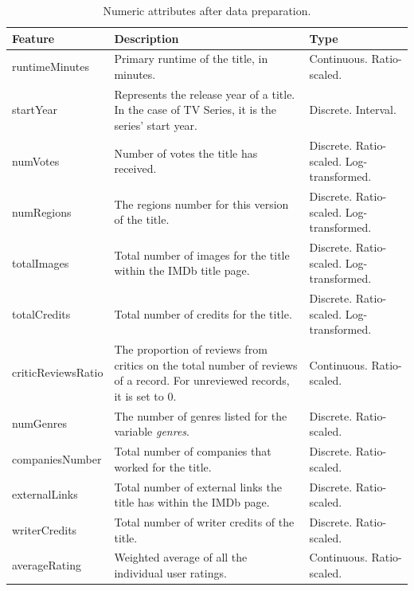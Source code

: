 \begin{table}[t]
    \centering
    \renewcommand{\arraystretch}{1.2}
    \scriptsize
    \begin{tabular}{p{2.5cm}p{7cm}p{4.5cm}}
    \toprule
    \textbf{Feature} & \textbf{Description} & \textbf{Type} \\
    \midrule
    runtimeMinutes & Primary runtime of the title, in minutes. & Continuous. Ratio-scaled. \\
    startYear & Represents the release year of a title. In the case of TV Series, it is the series’ start year. & Discrete. Interval. \\
    numVotes & Number of votes the title has received. & Discrete. Ratio-scaled. Log-transformed. \\
    numRegions & The regions number for this version of the title. & Discrete. Ratio-scaled. Log-transformed. \\
    totalImages & Total number of images for the title within the IMDb title page. & Discrete. Ratio-scaled. Log-transformed. \\
    totalCredits & Total number of credits for the title. & Discrete. Ratio-scaled. Log-transformed. \\
    criticReviewsRatio & The proportion of reviews from critics on the total number of reviews of a record. For unreviewed records, it is set to 0. & Continuous. Ratio-scaled. \\
    numGenres & The number of genres listed for the variable \textit{genres}. & Discrete. Ratio-scaled. \\
    companiesNumber & Total number of companies that worked for the title. & Discrete. Ratio-scaled. \\
    externalLinks & Total number of external links the title has within the IMDb page. & Discrete. Ratio-scaled. \\
    writerCredits & Total number of writer credits of the title. & Discrete. Ratio-scaled. \\
    averageRating & Weighted average of all the individual user ratings. & Continuous. Ratio-scaled. \\
    \bottomrule
    \end{tabular}
    \caption{Numeric attributes after data preparation.}
    \label{tab:dataset_numeric}
\end{table}

